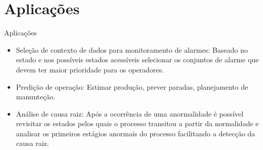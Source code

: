 \section{Aplicações}
\begin{frame}{Aplicações}
    \begin{itemize}
        \item Seleção de contexto de dados para monitoramento de alarmes: Baseado no estado e nos possíveis estados acessíveis selecionar os conjuntos de alarme que devem ter maior prioridade para os operadores.
        \item Predição de operação: Estimar produção, prever paradas, planejamento de manunteção.
        \item Análise de causa raiz: Após a ocorrência de uma anormalidade é possível revisitar os estados pelos quais o processo transitou a partir da normalidade e analisar os primeiros estágios anormais do processo facilitando a detecção da causa raiz. 
    \end{itemize}
\end{frame}